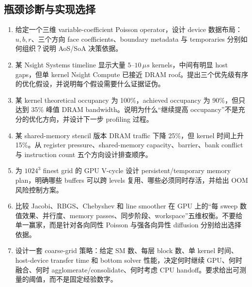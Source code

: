 \subsection*{瓶颈诊断与实现选择}
\begin{enumerate}[label=\arabic*.]
\item 给定一个三维 variable-coefficient Poisson operator，设计 device 数据布局：$u,b,r$、三个方向 face coefficients、boundary metadata 与 temporaries 分别如何组织？说明 AoS/SoA 决策依据。
\item 某 Nsight Systems timeline 显示大量 $5$--$10\,\mu s$ kernels，中间有明显 host gaps，但单 kernel Nsight Compute 已接近 DRAM roof。提出三个优先级有序的优化假设，并说明每个假设需要什么证据证伪。
\item 某 kernel theoretical occupancy 为 100\%，achieved occupancy 为 90\%，但只达到 35\% 峰值 DRAM bandwidth。说明为什么“继续提高 occupancy”不是充分的优化方向，并设计下一步 profiling 过程。
\item 某 shared-memory stencil 版本 DRAM traffic 下降 25\%，但 kernel 时间上升 15\%。从 register pressure、shared-memory capacity、barrier、bank conflict 与 instruction count 五个方向设计排查顺序。
\item 为 $1024^3$ finest grid 的 GPU V-cycle 设计 persistent/temporary memory plan，明确哪些 buffers 可以跨 levels 复用、哪些必须同时存活，并给出 OOM 风险控制方案。
\item 比较 Jacobi、RBGS、Chebyshev 和 line smoother 在 GPU 上的“每 sweep 数值效果、并行度、memory passes、同步阶段、workspace”五维权衡。不要给单一赢家，而是针对各向同性 Poisson 与强各向异性 diffusion 分别给出选择依据。
\item 设计一套 coarse-grid 策略：给定 SM 数、每层 block 数、单 kernel 时间、host-device transfer time 和 bottom solver 性能，决定何时继续 GPU、何时融合、何时 agglomerate/consolidate、何时考虑 CPU handoff。要求给出可测量的阈值，而不是固定经验数字。
\end{enumerate}
